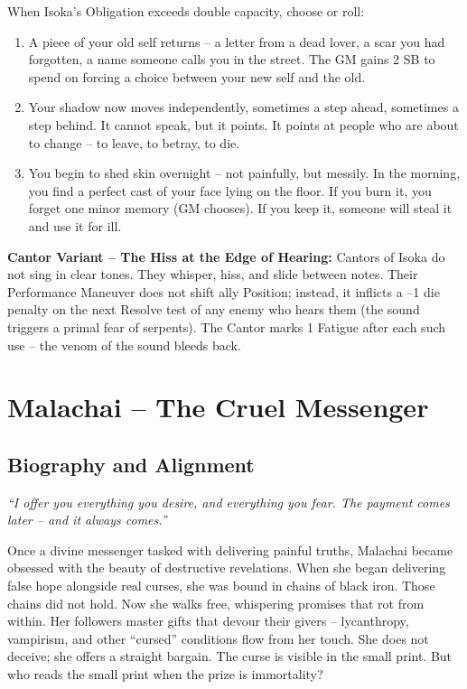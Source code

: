 \documentclass[10pt,a5paper]{book}
\begin{document}
When Isoka’s Obligation exceeds double capacity, choose or roll:
\begin{enumerate}
    \item A piece of your old self returns – a letter from a dead lover, a scar you had forgotten, a name someone calls you in the street. The GM gains 2 SB to spend on forcing a choice between your new self and the old.
    \item Your shadow now moves independently, sometimes a step ahead, sometimes a step behind. It cannot speak, but it points. It points at people who are about to change – to leave, to betray, to die.
    \item You begin to shed skin overnight – not painfully, but messily. In the morning, you find a perfect cast of your face lying on the floor. If you burn it, you forget one minor memory (GM chooses). If you keep it, someone will steal it and use it for ill.
\end{enumerate}

\noindent \textbf{Cantor Variant – The Hiss at the Edge of Hearing:}
Cantors of Isoka do not sing in clear tones. They whisper, hiss, and slide between notes. Their Performance Maneuver does not shift ally Position; instead, it inflicts a –1 die penalty on the next Resolve test of any enemy who hears them (the sound triggers a primal fear of serpents). The Cantor marks 1 Fatigue after each such use – the venom of the sound bleeds back.

\clearpage

\section{Malachai – The Cruel Messenger}
\label{patron:malachai}

\subsection*{Biography and Alignment}

\textit{“I offer you everything you desire, and everything you fear. The payment comes later – and it always comes.”}

Once a divine messenger tasked with delivering painful truths, Malachai became obsessed with the beauty of destructive revelations. When she began delivering false hope alongside real curses, she was bound in chains of black iron. Those chains did not hold. Now she walks free, whispering promises that rot from within. Her followers master gifts that devour their givers – lycanthropy, vampirism, and other “cursed” conditions flow from her touch. She does not deceive; she offers a straight bargain. The curse is visible in the small print. But who reads the small print when the prize is immortality?
\end{document}
